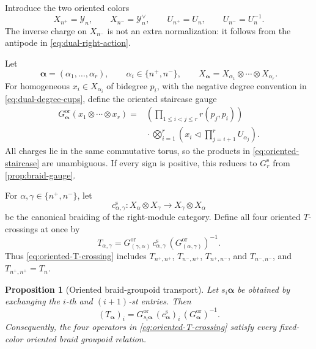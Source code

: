 \documentclass[11pt,a4paper]{article}
\newcommand{\ot}{\otimes}
\newcommand{\tri}{\mathbin{\triangleleft}}
\newtheorem{proposition}[theorem]{Proposition}
\theoremstyle{definition}
\theoremstyle{remark}
\begin{document}
Introduce the two oriented colors
\begin{equation}\label{eq:oriented-objects-charges}
 X_{n^+}=\mathcal Y_n,\qquad
 X_{n^-}=\mathcal Y_n^\vee,\qquad
 U_{n^+}=U_n,\qquad U_{n^-}=U_n^{-1}.
\end{equation}
The inverse charge on \(X_{n^-}\) is not an extra normalization: it
follows from the antipode in \eqref{eq:dual-right-action}.

Let
\[
 \boldsymbol\alpha=(\alpha_1,\ldots,\alpha_r),
 \qquad
 \alpha_i\in\{n^+,n^-\},\qquad
 X_{\boldsymbol\alpha}
 =X_{\alpha_1}\ot\cdots\ot X_{\alpha_r}.
\]
For homogeneous \(x_i\in X_{\alpha_i}\) of bidegree \(p_i\), with the
negative degree convention in \eqref{eq:dual-degree-cups}, define the
oriented staircase gauge
\begin{equation}\label{eq:oriented-staircase}
\begin{aligned}
G_{\boldsymbol\alpha}^{\mathrm{or}}
(x_1\ot\cdots\ot x_r)
={}&
\left(\prod_{1\leq i<j\leq r}r(p_j,p_i)\right)\\
&{}\cdot
\bigotimes_{i=1}^r
\left(x_i\tri\prod_{j=i+1}^rU_{\alpha_j}\right).
\end{aligned}
\end{equation}
All charges lie in the same commutative torus, so the products in
\eqref{eq:oriented-staircase} are unambiguous.  If every sign is positive,
this reduces to \(G_r^{\mathrm s}\) from \cref{prop:braid-gauge}.

For \(\alpha,\gamma\in\{n^+,n^-\}\), let
\[
 c_{\alpha,\gamma}^{\mathrm s}:
 X_\alpha\ot X_\gamma\longrightarrow X_\gamma\ot X_\alpha
\]
be the canonical braiding of the right-module category.  Define all four
oriented \(T\)-crossings at once by
\begin{equation}\label{eq:oriented-T-crossing}
 T_{\alpha,\gamma}
 =
 G_{(\gamma,\alpha)}^{\mathrm{or}}\,
 c_{\alpha,\gamma}^{\mathrm s}\,
 (G_{(\alpha,\gamma)}^{\mathrm{or}})^{-1}.
\end{equation}
Thus \eqref{eq:oriented-T-crossing} includes
\(T_{n^+,n^+}\), \(T_{n^-,n^+}\),
\(T_{n^+,n^-}\), and \(T_{n^-,n^-}\), and
\(T_{n^+,n^+}=T_n\).

\begin{proposition}[Oriented braid-groupoid transport]
\label{prop:oriented-transport}
Let \(s_i\boldsymbol\alpha\) be obtained by exchanging the \(i\)-th and
\((i+1)\)-st entries.  Then
\begin{equation}\label{eq:oriented-local-transport}
 (T_{\boldsymbol\alpha})_i
 =
 G_{s_i\boldsymbol\alpha}^{\mathrm{or}}\,
 (c_{\boldsymbol\alpha}^{\mathrm s})_i\,
 (G_{\boldsymbol\alpha}^{\mathrm{or}})^{-1}.
\end{equation}
Consequently, the four operators in
\eqref{eq:oriented-T-crossing} satisfy every fixed-color oriented braid
groupoid relation.
\end{proposition}
\end{document}
